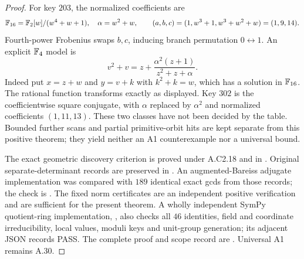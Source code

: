 \begin{proof}
For key $203$, the normalized coefficients are
\[
 \mathbb F_{16}=\mathbb F_2[w]/(w^4+w+1),\quad \alpha=w^2+w,
 \qquad(a,b,c)=(1,w^3+1,w^3+w^2+w)=(1,9,14).
\]
Fourth-power Frobenius swaps $b,c$, inducing
branch permutation $0\leftrightarrow1$.
An explicit $\mathbb F_4$ model is
\[
              v^2+v=z+\frac{\alpha^2(z+1)}{z^2+z+\alpha}.
                                                               \tag{C2.69}
\]
Indeed put $x=z+w$ and $y=v+k$ with
$k^2+k=w$, which has a solution in $\mathbb F_{16}$.
The rational function transforms exactly
as displayed. Key $302$ is the coefficientwise
square conjugate, with $\alpha$ replaced by
$\alpha^2$ and normalized coefficients
$(1,11,13)$.
These two classes have not been decided by
the table. Bounded further scans and partial
primitive-orbit hits are kept separate from
this positive theorem; they yield neither
an A1 counterexample nor a universal bound.

The exact geometric discovery criterion is
proved under A.C2.18 and in
.
Original separate-determinant records are
preserved in
.
An augmented-Bareiss adjugate implementation
was compared with $189$ identical exact gcds
from those records; the check is
.
The fixed norm certificates are an independent
positive verification and are sufficient for
the present theorem.
A wholly independent SymPy quotient-ring implementation,
, also checks
all $46$ identities, field and coordinate irreducibility,
local values, moduli keys and unit-group generation;
its adjacent JSON records PASS. The complete proof and
scope record are
.
Universal A1 remains A.30.
\end{proof}
